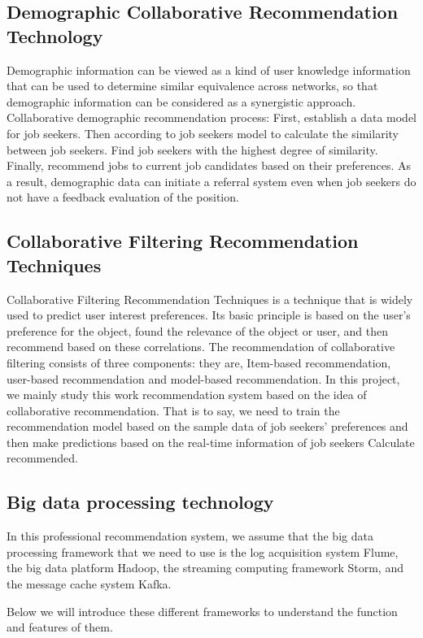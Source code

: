 \documentclass[sigconf]{acmart}
\begin{document}
\subsection{Demographic Collaborative Recommendation Technology}
Demographic information can be viewed as a kind of user knowledge information that can be used to determine similar equivalence across networks, so that demographic information can be considered as a synergistic approach. Collaborative demographic recommendation process: First, establish a data model for job seekers. Then according to job seekers model to calculate the similarity between job seekers. Find job seekers with the highest degree of similarity. Finally, recommend jobs to current job candidates based on their preferences. As a result, demographic data can initiate a referral system even when job seekers do not have a feedback evaluation of the position.

\subsection{Collaborative Filtering Recommendation Techniques}
Collaborative Filtering Recommendation Techniques is a technique that is widely used to predict user interest preferences. Its basic principle is based on the user's preference for the object, found the relevance of the object or user, and then recommend based on these correlations. The recommendation of collaborative filtering consists of three components: they are, Item-based recommendation, user-based recommendation and model-based recommendation. In this project, we mainly study this work recommendation system based on the idea of collaborative recommendation. That is to say, we need to train the recommendation model based on the sample data of job seekers' preferences and then make predictions based on the real-time information of job seekers Calculate recommended.

\subsection{Big data processing technology}
In this professional recommendation system, we assume that the big data processing framework that we need to use is the log acquisition system Flume, the big data platform Hadoop, the streaming computing framework Storm, and the message cache system Kafka.

\par Below we will introduce these different frameworks to understand the function and features of them.
\end{document}
